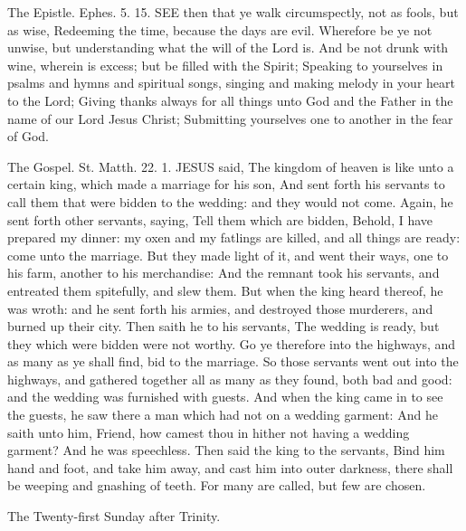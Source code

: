 The Epistle. Ephes. 5. 15.
SEE then that ye walk circumspectly, not as fools, but as wise, Redeeming the time, because the days are evil. Wherefore be ye not unwise, but understanding what the will of the Lord is. And be not drunk with wine, wherein is excess; but be filled with the Spirit; Speaking to yourselves in psalms and hymns and spiritual songs, singing and making melody in your heart to the Lord; Giving thanks always for all things unto God and the Father in the name of our Lord Jesus Christ; Submitting yourselves one to another in the fear of God.


The Gospel. St. Matth. 22. 1.
JESUS said, The kingdom of heaven is like unto a certain king, which made a marriage for his son, And sent forth his servants to call them that were bidden to the wedding: and they would not come. Again, he sent forth other servants, saying, Tell them which are bidden, Behold, I have prepared my dinner: my oxen and my fatlings are killed, and all things are ready: come unto the marriage. But they made light of it, and went their ways, one to his farm, another to his merchandise: And the remnant took his servants, and entreated them spitefully, and slew them. But when the king heard thereof, he was wroth: and he sent forth his armies, and destroyed those murderers, and burned up their city. Then saith he to his servants, The wedding is ready, but they which were bidden were not worthy. Go ye therefore into the highways, and as many as ye shall find, bid to the marriage. So those servants went out into the highways, and gathered together all as many as they found, both bad and good: and the wedding was furnished with guests. And when the king came in to see the guests, he saw there a man which had not on a wedding garment: And he saith unto him, Friend, how camest thou in hither not having a wedding garment? And he was speechless. Then said the king to the servants, Bind him hand and foot, and take him away, and cast him into outer darkness, there shall be weeping and gnashing of teeth. For many are called, but few are chosen.


The Twenty-first Sunday after Trinity.
\subsection{}



